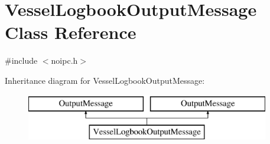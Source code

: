 \hypertarget{class_vessel_logbook_output_message}{}\section{Vessel\+Logbook\+Output\+Message Class Reference}
\label{class_vessel_logbook_output_message}


{\ttfamily \#include $<$noipc.\+h$>$}

Inheritance diagram for Vessel\+Logbook\+Output\+Message\+:\begin{figure}[H]
\begin{center}
\leavevmode
\includegraphics[height=2.000000cm]{da/d30/class_vessel_logbook_output_message}
\end{center}
\end{figure}
